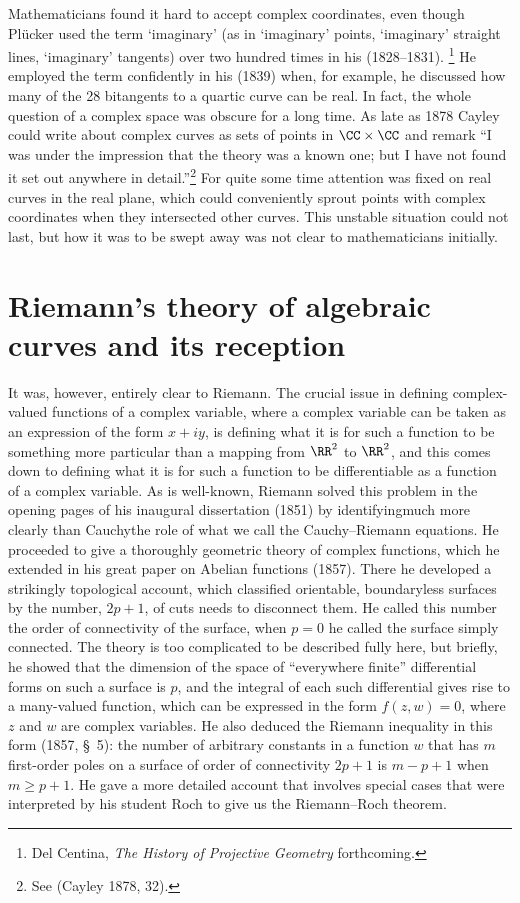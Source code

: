 Mathematicians found it hard to accept complex coordinates, even
though Pl\"ucker used the term `imaginary' (as in `imaginary' points,
`imaginary' straight lines, `imaginary' tangents) over two hundred
times in his (1828--1831).%
\footnote{Del Centina, \emph{The History of Projective Geometry} forthcoming.} 
%
He employed the term
confidently in his (1839) when, for example, he discussed how many of
the 28 bitangents to a quartic curve can be real. In fact, the whole
question of a complex space was obscure for a long time. As late as
1878 Cayley could write about complex curves as sets of points in
$\CC \times \CC$ and remark ``I was under the impression that the
theory was a known one; but I have not found it set out anywhere in
detail.''\footnote{See (Cayley 1878, 32).} For quite some time
attention was fixed on real curves in the real plane, which could
conveniently sprout points with complex coordinates when they
intersected other curves. This unstable situation could not last, but
how it was to be swept away was not clear to mathematicians initially.


\section{Riemann's theory of algebraic curves and its reception}
It was, however, entirely clear to Riemann. The crucial issue in defining com\-plex-valued functions of a complex variable, where a complex variable can be taken as an expression of the form $x+ iy$, is defining what it is for such a function to be something more particular than a mapping from $\RR^2$ to $\RR^2$, and this comes down to defining what it is for such a function to be differentiable as a function of a complex variable. As is well-known, Riemann solved this problem in the opening pages of his inaugural dissertation  (1851) by identifying\emdash much more clearly than Cauchy\emdash the role of what we call the Cauchy--Riemann equations. He proceeded to give a thoroughly geometric theory of complex functions, which he extended in his great paper on Abelian functions (1857). There he developed a strikingly topological account, which classified orientable, boundaryless surfaces by the number, $2p+1$, of cuts needs to disconnect them. He called this number the order of connectivity of the surface, when $p=0$ he called the surface simply connected. The theory is too complicated to be described fully here, but briefly, he showed that  the dimension of the space of ``everywhere finite'' differential forms on such a surface is $p$, and the integral of each such 
differential gives rise to a many-valued function, which can be expressed in the form $f(z, w) = 0$, where $z$ and $w$ are complex variables. He also deduced the Riemann inequality in this form (1857, \S\, 5):  the number of arbitrary constants in a function $w$ that has $m$ first-order poles on a surface of order of connectivity $2p+1$ is $m- p + 1$ when $m \geq p + 1$. He gave a more detailed account that involves special cases that were interpreted by his student Roch to give us the Riemann--Roch theorem. 

